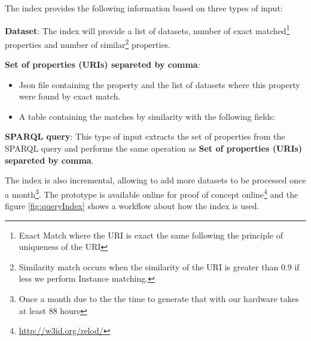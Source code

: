 The index provides the following information based on three types of input:
\begin{description}
    \item \textbf{Dataset}: The index will provide a list of datasets, number of exact matched\footnote{Exact Match where the URI is exact the same following the principle of uniqueness of the URI} properties and number of similar\footnote{Similarity match occurs when the similarity of the URI is greater than 0.9 if less we perform Instance matching.} properties.
    \item \textbf{Set of properties (URIs) separeted by comma}: 
    \begin{itemize}
        \item Json file containing the property and the list of datasets where this property were found by exact match.
        \item A table containing the matches by similarity with the following fields:
    \end{itemize}
    \item \textbf{SPARQL query}: This type of input extracts the set of properties from the SPARQL query and performs the same operation as \textbf{Set of properties (URIs) separeted by comma}.
\end{description}

The index is also incremental, allowing to add more datasets to be processed once a month\footnote{Once a month due to the the time to generate that with our hardware takes at least 88 hours}.
The prototype is available online for proof of concept online\footnote{\url{http://w3id.org/relod/}} and the figure \ref{fig:queryIndex} shows a workflow about how the index is used.




